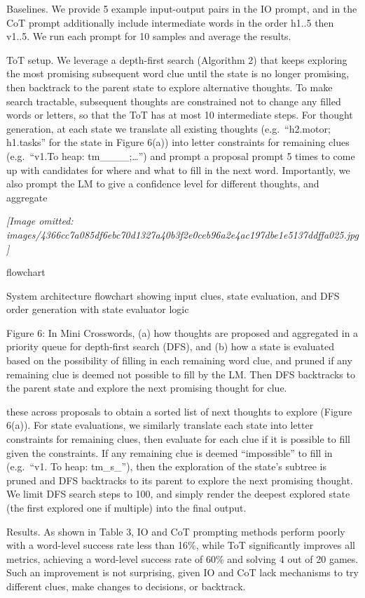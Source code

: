 \documentclass[
]{article}
\begin{document}
Baselines. We provide 5 example input-output pairs in the IO prompt, and
in the CoT prompt additionally include intermediate words in the order
h1..5 then v1..5. We run each prompt for 10 samples and average the
results.

ToT setup. We leverage a depth-first search (Algorithm 2) that keeps
exploring the most promising subsequent word clue until the state is no
longer promising, then backtrack to the parent state to explore
alternative thoughts. To make search tractable, subsequent thoughts are
constrained not to change any filled words or letters, so that the ToT
has at most 10 intermediate steps. For thought generation, at each state
we translate all existing thoughts (e.g.~``h2.motor; h1.tasks'' for the
state in Figure 6(a)) into letter constraints for remaining clues
(e.g.~``v1.To heap: tm\_\_\_\_;\ldots{}'') and prompt a proposal prompt
5 times to come up with candidates for where and what to fill in the
next word. Importantly, we also prompt the LM to give a confidence level
for different thoughts, and aggregate

\textit{[Image omitted: images/4366cc7a085df6ebc70d1327a40b3f2e0ceb96a2e4ac197dbe1e5137ddffa025.jpg]}

flowchart

System architecture flowchart showing input clues, state evaluation, and
DFS order generation with state evaluator logic

Figure 6: In Mini Crosswords, (a) how thoughts are proposed and
aggregated in a priority queue for depth-first search (DFS), and (b) how
a state is evaluated based on the possibility of filling in each
remaining word clue, and pruned if any remaining clue is deemed not
possible to fill by the LM. Then DFS backtracks to the parent state and
explore the next promising thought for clue.

these across proposals to obtain a sorted list of next thoughts to
explore (Figure 6(a)). For state evaluations, we similarly translate
each state into letter constraints for remaining clues, then evaluate
for each clue if it is possible to fill given the constraints. If any
remaining clue is deemed ``impossible'' to fill in (e.g.~``v1. To heap:
tm\_s\_''), then the exploration of the state's subtree is pruned and
DFS backtracks to its parent to explore the next promising thought. We
limit DFS search steps to 100, and simply render the deepest explored
state (the first explored one if multiple) into the final output.

Results. As shown in Table 3, IO and CoT prompting methods perform
poorly with a word-level success rate less than 16\%, while ToT
significantly improves all metrics, achieving a word-level success rate
of 60\% and solving 4 out of 20 games. Such an improvement is not
surprising, given IO and CoT lack mechanisms to try different clues,
make changes to decisions, or backtrack.
\end{document}
